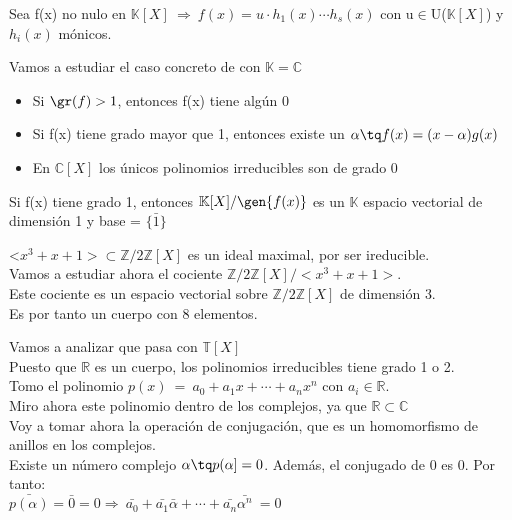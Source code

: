 \documentclass[nochap]{apuntes}
\begin{document}
\begin{theorem}
 Sea f(x) no nulo en $\mathbb{K}[X] \ \Rightarrow \ f(x)=u\cdot h_1(x) \cdots h_s(x)$  con u$\in$U($\mathbb{K}[X]$)  y $h_i(x)$  mónicos.
\end{theorem}

\begin{example}
 Vamos a estudiar el caso concreto de con $\mathbb{K}=\mathbb{C}$\\
 \begin{itemize}
  \item Si $\gr(f)>1$, entonces f(x) tiene algún 0
  \item Si f(x) tiene grado mayor que 1, entonces existe un $\alpha \tq f(x)=(x-\alpha)g(x)$
  \item En $\mathbb{C}[X]$  los únicos polinomios irreducibles son de grado 0
 \end{itemize}
\end{example}

\begin{lemma}
 Si f(x) tiene grado 1, entonces $\mathbb{K}[X]/\gen{f(x)}$  es un $\mathbb{K}$  espacio vectorial de dimensión 1 y base = $\{\bar{1}\}$
\end{lemma}

\begin{example}
 <$x^3+x+1>\subset \mathbb{Z}/2\mathbb{Z}[X]$  es un ideal maximal, por ser ireducible.\\
 Vamos a estudiar ahora el cociente $\mathbb{Z}/2\mathbb{Z}[X]/<x^3+x+1>$.\\
 Este cociente es un espacio vectorial sobre $\mathbb{Z}/2\mathbb{Z}[X]$  de dimensión 3.\\
 Es por tanto un cuerpo con 8 elementos.
\end{example}

Vamos a analizar que pasa con $\mathbb{T}[X]$\\

Puesto que $\mathbb{R}$  es un cuerpo, los polinomios irreducibles tiene grado 1 o 2.\\
Tomo el polinomio $p(x) \ = \ a_0+a_1x+\cdots + a_n x^{n}$  con $a_i\in \mathbb{R}$.\\

Miro ahora este polinomio dentro de los complejos, ya que $\mathbb{R}\subset \mathbb{C}$\\
Voy a tomar ahora la operación de conjugación, que es un homomorfismo de anillos en los complejos.\\

Existe un número complejo $\alpha \tq p(\alpha]=0$. Además, el conjugado de 0 es 0. Por tanto:\\
$\bar{p(\alpha)}=\bar{0}=0 \Rightarrow \ \bar{a_0}+\bar{a_1}\bar{\alpha}+\cdots + \bar{a_n}\bar{\alpha^{n}} \ = 0$\\
\end{document}
